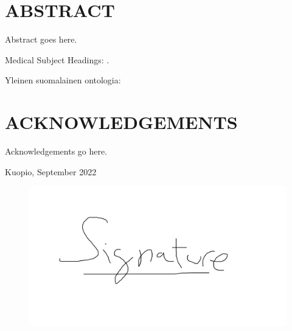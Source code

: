 \section*{ABSTRACT}
%

Abstract goes here.


%
\par
\vspace{5mm}
\noindent
%
%
%
Medical Subject Headings: .

\vspace{5mm}
\noindent
Yleinen suomalainen ontologia: 
%
\clearpage
%
\section*{{\fontsize{16pt}{0}\selectfont ACKNOWLEDGEMENTS}}



\vspace{0.5cm}
%

Acknowledgements go here.


%
\par
\vspace{9mm}
\noindent
Kuopio, September 2022    \\[3mm]
\begin{figure}[h]
    \includegraphics[width=0.4\linewidth]{figures/signature.png}
\end{figure}
      
